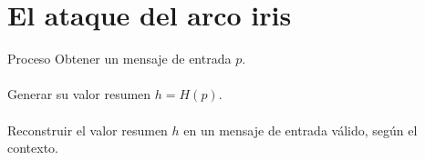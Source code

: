 \documentclass{beamer}
\begin{document}
%
%
%
%
%
%
%			
%
%

\section{El ataque del arco iris}

\begin{frame}{Proceso}
	Obtener un mensaje de entrada $p$.\\
	~\\
	Generar su valor resumen $h = H(p)$.\\
	~\\
	Reconstruir el valor resumen $h$ en un mensaje de entrada válido, según el contexto.
\end{frame}
\end{document}

